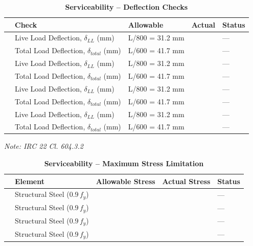 \documentclass[12pt,a4paper]{report}
\numberwithin{table}{chapter}
\numberwithin{figure}{chapter}
\begin{document}
\vspace{1em}
\begin{longtable}{|C{2.5cm}|L{3.5cm}|C{3.5cm}|>{\centering\arraybackslash}p{3.5cm}|C{2.5cm}|}
\caption{\textbf{Serviceability -- Deflection Checks}}
\hline
\textbf{} & \textbf{Check} & \textbf{Allowable} & \textbf{Actual} & \textbf{Status} \\[6pt]
\hline
{} & Live Load Deflection, $\delta_{LL}$ (mm) & L/800 = 31.2 mm &  & --- \\[6pt]
 & Total Load Deflection, $\delta_{total}$ (mm) & L/600 = 41.7 mm &  & --- \\[6pt]
\hline
{} & Live Load Deflection, $\delta_{LL}$ (mm) & L/800 = 31.2 mm &  & --- \\[6pt]
 & Total Load Deflection, $\delta_{total}$ (mm) & L/600 = 41.7 mm &  & --- \\[6pt]
\hline
{} & Live Load Deflection, $\delta_{LL}$ (mm) & L/800 = 31.2 mm &  & --- \\[6pt]
 & Total Load Deflection, $\delta_{total}$ (mm) & L/600 = 41.7 mm &  & --- \\[6pt]
\hline
{} & Live Load Deflection, $\delta_{LL}$ (mm) & L/800 = 31.2 mm &  & --- \\[6pt]
 & Total Load Deflection, $\delta_{total}$ (mm) & L/600 = 41.7 mm &  & --- \\[6pt]
\hline
\end{longtable}
\noindent\textit{Note: IRC 22 Cl. 604.3.2}

\vspace{1em}
\begin{longtable}{|C{2.5cm}|L{3.5cm}|C{3.5cm}|>{\centering\arraybackslash}p{3.5cm}|C{2.5cm}|}
\caption{\textbf{Serviceability -- Maximum Stress Limitation}}
\hline
\textbf{} & \textbf{Element} & \textbf{Allowable Stress} & \textbf{Actual Stress} & \textbf{Status} \\[6pt]
\hline
{} & Structural Steel ($0.9\,f_y$) &  &  & --- \\[6pt]
\hline
{} & Structural Steel ($0.9\,f_y$) &  &  & --- \\[6pt]
\hline
{} & Structural Steel ($0.9\,f_y$) &  &  & --- \\[6pt]
\hline
{} & Structural Steel ($0.9\,f_y$) &  &  & --- \\[6pt]
\hline
\end{longtable}
\end{document}
